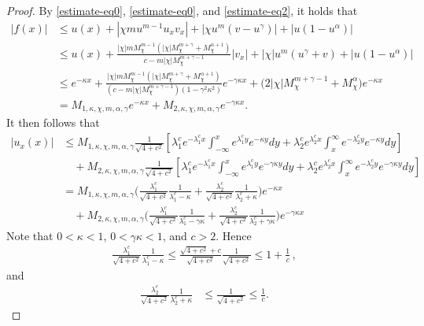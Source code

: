 \documentclass[11pt]{article} %
\theoremstyle{remark}
\theoremstyle{remark}
\numberwithin{equation}{section}
\numberwithin{figure}{section}
\numberwithin{table}{section}
\begin{document}
\begin{proof}
By \eqref{estimate-eq0}, \eqref{estimate-eq0},  and \eqref{estimate-eq2}, it holds that 
\begin{align*}
|f(x)|&\le u(x)+|\chi m u^{m-1} u_x v_x|+|\chi u^m (v-u^\gamma)|+|u(1-u^\alpha)|\\
&\le  u(x)+\frac{|\chi| m M_\chi^{m-1} (|\chi| M_{\chi}^{m+\gamma}+M_{\chi}^{\alpha+1})}{c- m|\chi| M^{m+\gamma-1}_\chi} |v_x| + |\chi| u^m (u^\gamma +v) +| u(1-u^\alpha)| \\
&\le   e^{-\kappa x}+\frac{|\chi| m M_{\chi}^{m-1} (|\chi| M_{\chi}^{m+\gamma}+M_\chi^{\alpha+1}) }{(c- m|\chi| M^{m+\gamma-1}_{\chi})(1-\gamma^2\kappa^2)} e^{-\gamma \kappa  x} +\Big( 2 |\chi| M^{m+\gamma-1}_\chi+M_\chi^{\alpha}\Big) e^{-\kappa   x}\\
&=M_{1,\kappa,\chi,m,\alpha,\gamma} e^{-\kappa x} +M_{2,\kappa,\chi,m,\alpha,\gamma} e^{-\gamma\kappa x}.
\end{align*}
It then follows that
\begin{align*}
|u_x(x)|&\le M_{1,\kappa,\chi,m,\alpha,\gamma}  \frac{1}{\sqrt{4+c^2}}\left[ \lambda_1^c e^{-\lambda_1^c x}\int_{-\infty}^x e^{\lambda_1^c y} e^{-\kappa y} dy
+\lambda_2^c e^{\lambda_2^c x}\int_x^\infty e^{-\lambda_2 ^c y} e^{-\kappa y} dy\right]\\
&\quad + M_{2,\kappa,\chi,m,\alpha,\gamma}  \frac{1}{\sqrt{4+c^2}}\left[ \lambda_1^c e^{-\lambda_1^c x}\int_{-\infty}^x e^{\lambda_1^c y} e^{-\gamma \kappa y} dy
+\lambda_2^c e^{\lambda_2^c x}\int_x^\infty e^{-\lambda_2 ^c y} e^{-\gamma \kappa y} dy\right]\\
&=
 M_{1,\kappa,\chi,m,\alpha,\gamma}  \Big(\frac{\lambda_1^c}{\sqrt{4+c^2}}\frac{1}{\lambda_1^c -\kappa}+
\frac{\lambda_2^c}{\sqrt{4+c^2}}\frac{1}{\lambda_2^c+\kappa}\Big) e^{-\kappa x}
\\
&\quad + M_{2,\kappa,\chi,m,\alpha,\gamma}  \Big(\frac{\lambda_1^c}{\sqrt{4+c^2}}\frac{1}{\lambda_1^c -\gamma \kappa}+
\frac{\lambda_2^c}{\sqrt{4+c^2}}\frac{1}{\lambda_2^c+\gamma \kappa}\Big) e^{-\gamma \kappa x}
\end{align*}
 Note that $0<\kappa<1$, $0<\gamma\kappa<1$, and $c>2$. Hence
\begin{align*}
\frac{\lambda_1^c}{\sqrt{4+c^2}}\frac{1}{\lambda_1^c -\kappa}\le  
\frac{\sqrt{4+c^2}+c}{\sqrt{4+c^2}}\frac{1}{\sqrt{4+c^2}}\le 1+ \frac{1}{c}\, ,
\end{align*}
and
\begin{align*}
\frac{\lambda_2^c}{\sqrt{4+c^2}}\frac{1}{\lambda_2^c+\kappa}&\le  \frac{1}{\sqrt{4+c^2}}\le \frac{1}{c}.
\end{align*} 

\end{proof}
\end{document}
